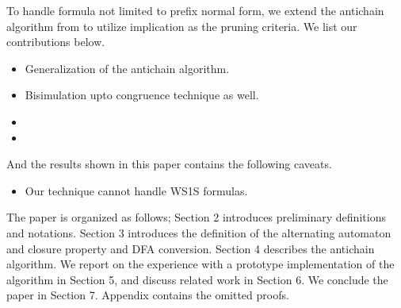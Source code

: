   To handle formula not limited to prefix normal
form, we extend the antichain algorithm from \cite{Wulf2006} to utilize
implication as the pruning criteria. We list our contributions below.

\begin{itemize}
\item Generalization of the antichain algorithm.
\item Bisimulation upto congruence technique \cite{BonchiP13} as well.
\item {}
\item {}
\end{itemize}

And the results shown in this paper contains the following caveats.
\begin{itemize}
\item Our technique cannot handle WS1S formulas.
\end{itemize}

The paper is organized as follows; Section 2 introduces preliminary definitions
and notations. Section 3 introduces the definition of the alternating automaton
and closure property and DFA conversion. Section 4 describes the antichain
algorithm. We report on the experience with a prototype implementation of the
algorithm in Section 5, and discuss related work in Section 6. We conclude the
paper in Section 7. Appendix contains the omitted proofs.
